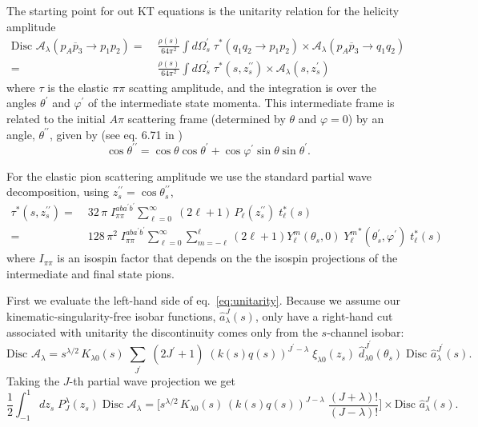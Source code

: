 \documentclass[10pt, aps,prd,amsmath,amssymb,superscriptaddress,onecolumn,
nofootinbib,showpacs,preprintnumbers]{revtex4-1}
\newcommand{\Disc}{\text{Disc }}
\begin{document}
The starting point for out KT equations is the unitarity relation for the helicity amplitude
  \begin{align}
    \label{eq:unitarity}
    \Disc \mathcal{A}_\lambda(p_A \overline{p}_3 \to p_1 p_2 ) =&\; \frac{\rho(s)}{64 \pi^2} \int d\Omega_s^\prime  \; \tau^*(q_1q_2 \to p_1p_2) \times \mathcal{A}_\lambda(p_A \overline{p}_{3} \to q_1 q_2 ) \nonumber \\
    =& \; \frac{\rho(s)}{64 \pi^2} \int d\Omega_s^\prime  \; \tau^*(s,z_s^{\prime\prime}) \times \mathcal{A}_\lambda(s,z_s^{\prime})
  \end{align}
where \(\tau\) is the elastic \(\pi\pi\) scatting amplitude, and the integration is over the angles \(\theta^\prime\) and \(\varphi^\prime\) of the intermediate state momenta. This intermediate frame is related to the initial \(A\pi\) scattering frame (determined by \(\theta\) and \(\varphi = 0\)) by an angle, \(\theta^{\prime\prime}\), given by (see eq. 6.71 in \cite{MS})
  \begin{equation}
    \cos \theta^{\prime\prime} = \cos \theta \cos \theta^\prime + \cos \varphi^\prime \sin\theta \sin \theta^\prime.
  \end{equation}

For the elastic pion scattering amplitude we use the standard partial wave decomposition, using \( z_s^{\prime\prime} = \cos \theta_s^{\prime\prime}\),
  \begin{align}
    \label{eq:elastic-pion}
    \tau^*(s, z_s^{\prime\prime}) =& \; 32 \, \pi \; I^{aba^\prime b^\prime}_{\pi\pi} \sum_{\ell=0  }^\infty \; (2\ell+1) \, P_{\ell}(z_s^{\prime\prime}) \; t_\ell^*(s) \nonumber \\
    =& \; 128 \, \pi^2 \; I_{\pi\pi}^{aba^\prime b^\prime} \sum_{\ell=0}^\infty \sum_{m=-\ell}^{\ell} (2\ell +1 ) Y^m_\ell(\theta_s,0) \; {Y^m_\ell}^*(\theta_s^\prime, \varphi^\prime) \; t_\ell^*(s)
  \end{align}
where \(I_{\pi\pi}\) is an isospin factor that depends on the the isospin projections of the intermediate and final state pions.

First we evaluate the left-hand side of eq.~\ref{eq:unitarity}. Because we assume our kinematic-singularity-free isobar functions, \(\hat{a}_\lambda^J(s)\), only have a right-hand cut associated with unitarity the discontinuity comes only from the \(s\)-channel isobar:
  \begin{equation}
    \label{eq:discontinuity}
    \Disc \mathcal{A}_\lambda = s^{\lambda/2}\, K_{\lambda 0}(s) \; \sum_{J^\prime} \; (2 J^\prime +1) \; (k(s)q(s))^{J^\prime-\lambda}  \; \xi_{\lambda 0}(z_s)
    \; \hat{d}^{J^\prime}_{\lambda 0}(\theta_s) \; \Disc \hat{a}_\lambda^{J^\prime}(s).
  \end{equation}
Taking the \(J\)-th partial wave projection we get
  \begin{equation}
    \label{eq:pw-disc}
    \frac{1}{2} \int_{-1}^1 dz_s \; P^\lambda_{J}(z_s) \; \Disc \mathcal{A}_\lambda =
    \bigg[ s^{\lambda/2} \, K_{\lambda 0}(s) \, (k(s)q(s))^{J-\lambda} \; \frac{(J+\lambda)!}{(J-
    \lambda)!} \bigg] \times \Disc \hat{a}^J_\lambda(s).
  \end{equation}
\end{document}

